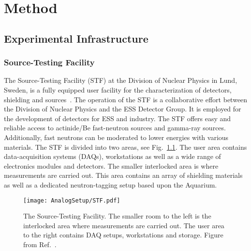 \documentclass[main.tex]{subfiles}
\begin{document}
\chapter{Method}
\section{Experimental Infrastructure}
\subsection{Source-Testing Facility}
The Source-Testing Facility (STF) at the Division of Nuclear Physics in Lund, Sweden, is a fully equipped user facility for the characterization of detectors, shielding and sources~\cite{Messi}.
The operation of the STF is a collaborative effort between the Division of Nuclear Physics and the ESS Detector Group. It is employed for the development of detectors for ESS and industry. The STF offers easy and reliable access to actinide/Be fast-neutron sources and gamma-ray sources. Additionally, fast neutrons can be moderated to lower energies with various materials. The STF is divided into two areas, see Fig.~\ref{fig:STF}. The user area contains data-acquisition systems (DAQs), workstations as well as a wide range of electronics modules and detectors. The smaller interlocked area is where measurements are carried out. This area contains an array of shielding materials as well as a dedicated neutron-tagging setup based upon the Aquarium.

\begin{figure}[ht]
	\center
    	\texttt{[image: AnalogSetup/STF.pdf]}
	\caption[The Source-Testing Facility.]{The Source-Testing Facility. The smaller room to the left is the interlocked area where measurements are carried out. The user area to the right contains DAQ setups, workstations and storage. Figure from Ref.~\cite{Messi}.}
	\label{fig:STF}
\end{figure}
\end{document}

